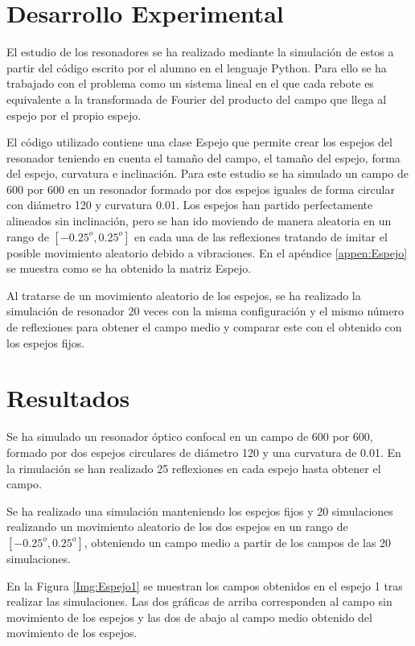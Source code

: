 \documentclass[twoside]{article}
\begin{document}
\begin{multicols}{2}
			\section{Desarrollo Experimental}

				El estudio de los resonadores se ha realizado mediante la simulación de estos a partir del código \cite{Resonador} escrito por el alumno en el lenguaje Python. Para ello se ha trabajado con el problema como un sistema lineal en el que cada rebote es equivalente a la transformada de Fourier del producto del campo que llega al espejo por el propio espejo.

				El código utilizado contiene una clase Espejo que permite crear los espejos del resonador teniendo en cuenta el tamaño del campo, el tamaño del espejo, forma del espejo, curvatura e inclinación. Para este estudio se ha simulado un campo de 600 por 600 en un resonador formado por dos espejos iguales de forma circular con diámetro 120 y curvatura 0.01. Los espejos han partido perfectamente alineados sin inclinación, pero se han ido moviendo de manera aleatoria en un rango de $[-0.25^o, 0.25^o]$ en cada una de las reflexiones tratando de imitar el posible movimiento aleatorio debido a vibraciones. En el apéndice \ref{appen:Espejo} se muestra como se ha obtenido la matriz Espejo.

				Al tratarse de un movimiento aleatorio de los espejos, se ha realizado la simulación de resonador 20 veces con la misma configuración y el mismo número de reflexiones para obtener el campo medio y comparar este con el obtenido con los espejos fijos.

			\section{Resultados}

				Se ha simulado un resonador óptico confocal en un campo de 600 por 600, formado por dos espejos circulares de diámetro 120 y una curvatura de 0.01. En la rimulación se han realizado 25 reflexiones en cada espejo hasta obtener el campo.

				Se ha realizado una simulación manteniendo los espejos fijos y 20 simulaciones realizando un movimiento aleatorio de los dos espejos en un rango de $[-0.25^o , 0.25^o]$, obteniendo un campo medio a partir de los campos de las 20 simulaciones.

				En la Figura \ref{Img:Espejo1} se muestran los campos obtenidos en el espejo 1 tras realizar las simulaciones. Las dos gráficas de arriba corresponden al campo sin movimiento de los espejos y las dos de abajo al campo medio obtenido del movimiento de los espejos.


\end{multicols}
\end{document}
